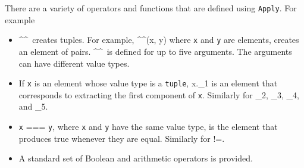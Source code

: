








There are a variety of operators and functions that are defined using \texttt{Apply}. For example
\begin{itemize}
\item \textasciicircum \textasciicircum \ creates tuples. For example, \textasciicircum \textasciicircum(x, y) where \texttt{x} and \texttt{y} are elements, creates an element of pairs. \textasciicircum \textasciicircum \ is defined for up to five arguments. The arguments can have different value types.
\item If \texttt{x} is an element whose value type is a \texttt{tuple}, x.\_1 is an element that corresponds to extracting the first component of \texttt{x}. Similarly for \_2, \_3, \_4, and \_5.
\item \texttt{x} === \texttt{y}, where \texttt{x} and \texttt{y} have the same value type, is the element that produces true whenever they are equal. Similarly for !=.
\item A standard set of Boolean and arithmetic operators is provided.
\end{itemize}

